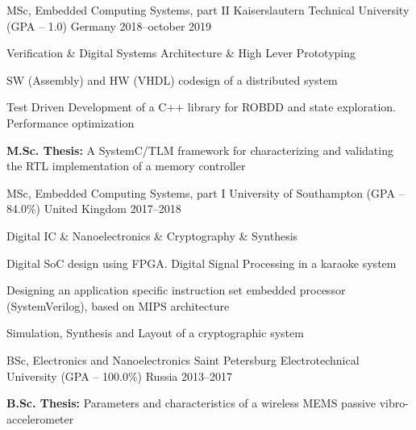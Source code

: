 

\begin{cventries}


  \cventry
  	{MSc, Embedded Computing Systems, part II}
  	{Kaiserslautern Technical University (GPA -- 1.0)}
  	{Germany}%
  	{2018--october 2019}
    {
      \begin{cvitems} %
        \item {Verification \& Digital Systems Architecture \& High Lever Prototyping}
        \item {SW (Assembly) and HW (VHDL) codesign of a distributed system}
        \item {Test Driven Development of a C++ library for ROBDD and state exploration. Performance optimization}
        \item {\textbf{M.Sc. Thesis:} A SystemC/TLM framework for characterizing and validating the RTL implementation of a memory controller}
      \end{cvitems}
    }

  \cventry
    {MSc, Embedded Computing Systems, part I}
    {University of Southampton (GPA -- 84.0\%)}
    {United Kingdom}%
    {2017--2018}
    {
      \begin{cvitems} %
        \item {Digital IC \& Nanoelectronics \& Cryptography \& Synthesis}
        \item {Digital SoC design using FPGA. Digital Signal Processing in a karaoke system}
        \item {Designing an application specific instruction set embedded processor (SystemVerilog), based on MIPS architecture}
        \item {Simulation, Synthesis and Layout of a cryptographic system}
      \end{cvitems}
    }

  \cventry
    {BSc, Electronics and Nanoelectronics}
    {Saint Petersburg Electrotechnical University (GPA -- 100.0\%)}
    {Russia}%
    {2013--2017}
    {
      \begin{cvitems} %
        \item {\textbf{B.Sc. Thesis:} Parameters and characteristics of a wireless MEMS passive vibro-accelerometer}
      \end{cvitems}
    }


\end{cventries}
